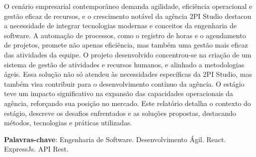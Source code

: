 \documentclass[
	12pt,				    %
	openright,			    %
	oneside,			    %
	a4paper,			    %
    sumario=tradicional,    %
	english,			    %
	brazilian,				    %
	]{abntex2}
\begin{document}
\frenchspacing

\pretextual

\imprimircapa

\imprimirfolhaderosto

\imprimirfolhadeaprovacao

\begin{resumo}
    \noindent

O cenário empresarial contemporâneo demanda agilidade, eficiência operacional e gestão eficaz de recursos, e o crescimento notável da agência 2PI Studio destacou a necessidade de integrar tecnologias modernas e conceitos da engenharia de software. A automação de processos, como o registro de horas e o agendamento de projetos, promete não apenas eficiência, mas também uma gestão mais eficaz das atividades da equipe. O projeto desenvolvido concentrou-se na criação de um sistema de gestão de atividades e recursos humanos, e alinhado a metodologias ágeis. Essa solução não só atendeu às necessidades específicas da 2PI Studio, mas também visa contribuir para o desenvolvimento contínuo da agência.
O estágio teve um impacto significativo na expansão das capacidades operacionais da agência, reforçando sua posição no mercado. Este relatório detalha o contexto do estágio, descreve os desafios enfrentados e as soluções propostas, destacando métodos, tecnologias e práticas utilizadas.

    \vspace{\onelineskip}

    \noindent
    \textbf{Palavras-chave}: Engenharia de Software. Desenvolvimento Ágil. React. ExpressJs. API Rest.
\end{resumo}
\end{document}
